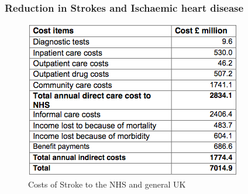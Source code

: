 \documentclass[11pt]{article}
\begin{document}
\subsubsection{Reduction in Strokes and Ischaemic heart disease} 

\begin{figure}
\centering
\includegraphics[scale=0.4]{strokecost.png}
\caption{Costs of Stroke to the NHS and general UK \label{strokecost}} 
\end{figure}
\end{document}
